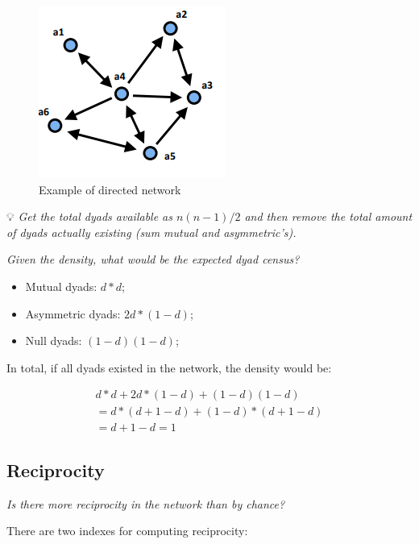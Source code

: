 \documentclass[
  notitlepage,
  onecolumn,
  openany]{book}
\providecommand{\tightlist}{%
  \setlength{\itemsep}{0pt}\setlength{\parskip}{0pt}}
\begin{document}
\begin{figure}[h!]

{\centering \includegraphics[width=0.5\linewidth]{images/12-Reciprocity and transitivity/Untitled} 

}

\caption{Example of directed network}\label{fig:unnamed-chunk-100}
\end{figure}

💡 \emph{Get the total dyads available as \(n(n-1)/2\) and then remove the total amount of dyads actually existing (sum mutual and asymmetric's).}

\emph{Given the density, what would be the expected dyad census?}

\begin{itemize}
\tightlist
\item
  Mutual dyads: \(d*d\);
\item
  Asymmetric dyads: \(2d*(1-d)\);
\item
  Null dyads: \((1-d)(1-d)\);
\end{itemize}

In total, if all dyads existed in the network, the density would be:

\[
\begin{aligned}
d*d+2d*(1-d)+(1-d)(1-d) \\
= d*(d+1-d)+(1-d)*(d+1-d) \\
= d+1-d = 1
\end{aligned}
\]

\hypertarget{reciprocity}{%
\subsection{Reciprocity}\label{reciprocity}}

\emph{Is there more reciprocity in the network than by chance?}

There are two indexes for computing reciprocity:
\end{document}
